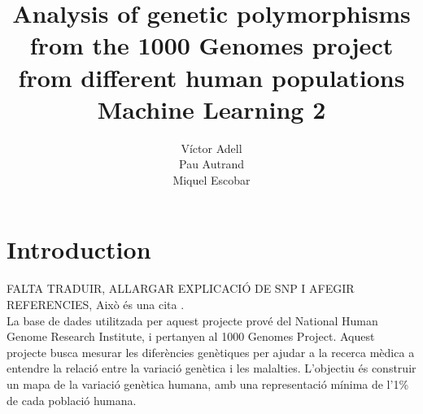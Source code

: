 \documentclass[a4paper, 11pt]{article}
\theoremstyle{definition}
\theoremstyle{remark}
\begin{document}




\title{
\textbf{Analysis of genetic polymorphisms from the 1000 Genomes project from different human populations}\\
\vspace{2cm}
Machine Learning 2
\vspace{2cm}
}

\author{
Víctor Adell \\
Pau Autrand \\
Miquel Escobar\\
\vspace{1cm}
}


\clearpage
\maketitle
\thispagestyle{empty}

\newpage
\clearpage






\renewcommand{\cfttoctitlefont}{\Large\bfseries}
\setlength\cftaftertoctitleskip{20pt}
\setlength\cftbeforesecskip{10pt}

\thispagestyle{plain}
\setcounter{page}{2}

\tableofcontents
\newpage
\clearpage






\section{Introduction}

FALTA TRADUIR, ALLARGAR EXPLICACIÓ DE SNP I AFEGIR REFERENCIES, Això és una cita \cite{einstein}.\\

La base de dades utilitzada per aquest projecte prové del National Human Genome Research Institute, i pertanyen al 1000 Genomes Project. Aquest projecte busca mesurar les diferències genètiques per ajudar a la recerca mèdica a entendre la relació entre la variació genètica i les malalties. L’objectiu és construir un mapa de la variació genètica humana, amb una representació mínima de l’1\% de cada població humana.\\
\end{document}
